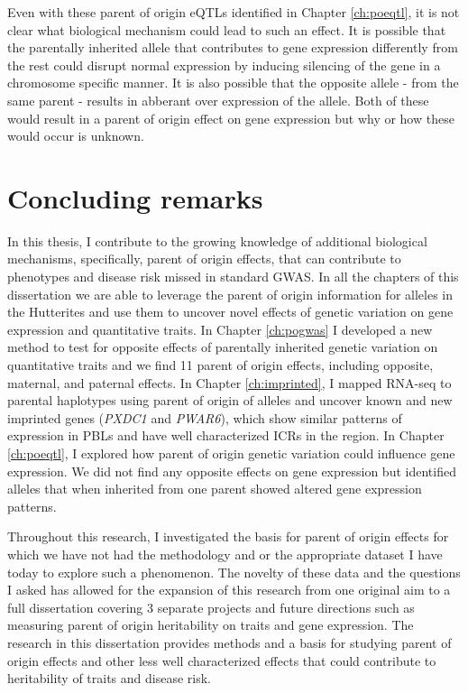 Even with these parent of origin eQTLs identified in Chapter \ref{ch:poeqtl}, it is not clear what biological mechanism could lead to such an effect. It is possible that the parentally inherited allele that contributes to gene expression differently from the rest could disrupt normal expression by inducing silencing of the gene in a chromosome specific manner. It is also possible that the opposite allele - from the same parent - results in abberant over expression of the allele. Both of these would result in a parent of origin effect on gene expression but why or how these would occur is unknown. 

\section{Concluding remarks}

In this thesis, I contribute to the growing knowledge of additional biological mechanisms, specifically, parent of origin effects, that can contribute to phenotypes and disease risk missed in standard GWAS. In all the chapters of this dissertation we are able to leverage the parent of origin information for alleles in the Hutterites and use them to uncover novel effects of genetic variation on gene expression and quantitative traits. In Chapter \ref{ch:pogwas} I developed a new method to test for opposite effects of parentally inherited genetic variation on quantitative traits and we find 11 parent of origin effects, including opposite, maternal, and paternal effects. In Chapter \ref{ch:imprinted}, I mapped RNA-seq to parental haplotypes using parent of origin of alleles and uncover known and new imprinted genes (\emph{PXDC1} and \emph{PWAR6}), which show similar patterns of expression in PBLs and have well characterized ICRs in the region. In Chapter \ref{ch:poeqtl}, I explored how parent of origin genetic variation could influence gene expression. We did not find any opposite effects on gene expression but identified alleles that when inherited from one parent showed altered gene expression patterns. 

Throughout this research, I investigated the basis for parent of origin effects for which we have not had the methodology and or the appropriate dataset I have today to explore such a phenomenon. The novelty of these data and the questions I asked  has allowed for the expansion of this research from one original aim to a full dissertation covering 3 separate projects and future directions such as measuring parent of origin heritability on traits and gene expression. The research in this dissertation provides methods and a basis for studying parent of origin effects and other less well characterized effects that could contribute to heritability of traits and disease risk. 




